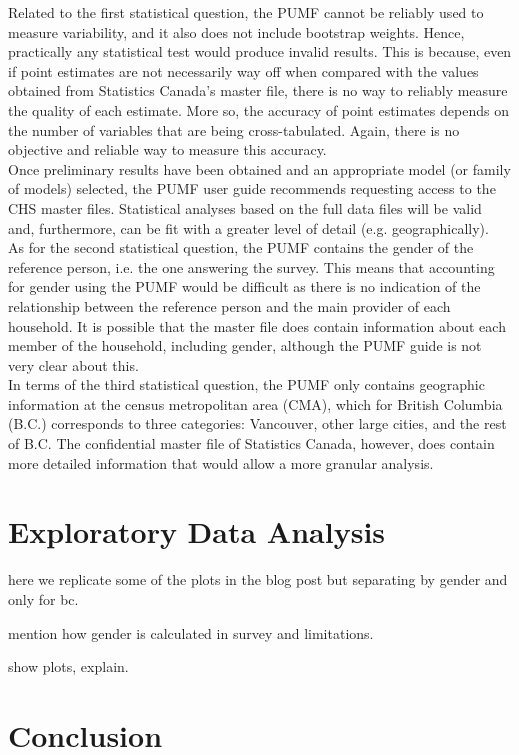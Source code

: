 \documentclass[11pt]{article}
\begin{document}
Related to the first statistical question, the PUMF cannot be reliably used
to measure variability, and it also does not include bootstrap weights.
Hence, practically any statistical test would produce invalid results.
This is because, even if point estimates are not necessarily way off
when compared with the values obtained from Statistics Canada's master file,
there is no way to reliably measure the quality of each estimate.
More so, the accuracy of point estimates depends on the number of variables
that are being cross-tabulated. Again, there is no objective and reliable way
to measure this accuracy.
\\

Once preliminary results have been obtained and an appropriate model
(or family of models) selected, the PUMF user guide \cite{chsguide} recommends
requesting access to the CHS master files. Statistical analyses based on
the full data files will be valid and, furthermore, can be fit
with a greater level of detail (e.g. geographically).
\\

As for the second statistical question, the PUMF contains the gender
of the reference person, i.e. the one answering the survey.
This means that accounting for gender using the PUMF would be difficult
as there is no indication of the relationship between the reference person
and the main provider of each household. It is possible that the master file
does contain information about each member of the household, including gender,
although the PUMF guide is not very clear about this.
\\

In terms of the third statistical question, the PUMF only
contains geographic information at the census metropolitan area (CMA),
which for British Columbia (B.C.) corresponds to three categories:
Vancouver, other large cities, and the rest of B.C. The confidential
master file of Statistics Canada, however, does contain more detailed
information that would allow a more granular analysis.




\section{Exploratory Data Analysis} \label{sec:eda}

here we replicate some of the plots in the blog post but separating by gender and only for bc.

mention how gender is calculated in survey and limitations.

show plots, explain.




\section{Conclusion} \label{sec:conclusion}





\clearpage


\end{document}
